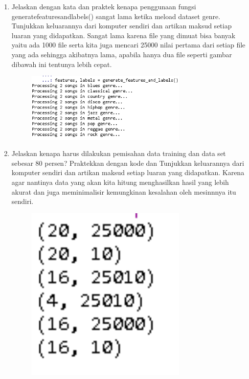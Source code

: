 \begin{enumerate}
\begin{figure}[H]
	\end{figure}
	\item Jelaskan dengan kata dan praktek kenapa penggunaan fungsi generatefeaturesandlabels() sangat lama ketika meload dataset  genre. Tunjukkan keluarannya dari komputer sendiri dan artikan maksud setiap luaran yang didapatkan.
	\hfill\break
	Sangat lama karena file yang dimuat bisa banyak yaitu ada 1000 file serta kita juga mencari 25000 nilai pertama dari setiap file yang ada sehingga akibatnya lama, apabila hanya dua file seperti gambar dibawah ini tentunya lebih cepat.
	\hfill\break
	\begin{figure}[H]
		\includegraphics[width=8cm]{figures/1174071/6/4.png}
		\centering
	\end{figure}
	\item Jelaskan kenapa harus dilakukan pemisahan data training dan data set sebesar 80 persen? Praktekkan dengan kode dan Tunjukkan keluarannya dari komputer sendiri dan artikan maksud setiap luaran yang didapatkan.
	\hfill\break
	Karena agar nantinya data yang akan kita hitung menghasilkan hasil yang lebih akurat dan juga meminimalisir kemungkinan kesalahan oleh mesinnnya itu sendiri.
	
	\hfill\break
	\begin{figure}[H]
		\includegraphics[width=8cm]{figures/1174071/6/6.PNG}
		\centering

\end{figure}
\end{enumerate}
